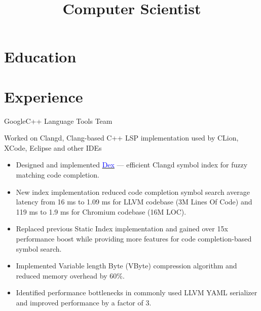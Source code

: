 \documentclass[10pt,a4paper,sans]{moderncv}
\title{Computer Scientist}
\begin{document}
\makecvtitle

\section{Education}

\section{Experience}
    {Google}{}{C++ Language Tools Team}
    {Worked on Clangd, Clang-based C++ LSP implementation used by CLion, XCode,
     Eclipse and other IDEs
     \begin{itemize}
       \item Designed and implemented
         \href{https://docs.google.com/document/d/1C-A6PGT6TynyaX4PXyExNMiGmJ2jL1UwV91Kyx11gOI/edit?usp=sharing}
         {\textcolor{blue}{Dex}} --- efficient Clangd symbol index for fuzzy
         matching code completion.
       \item New index implementation reduced code completion symbol search
         average latency from 16 ms to 1.09 ms for LLVM codebase (3M Lines Of
         Code) and 119 ms to 1.9 ms for Chromium codebase (16M LOC).
       \item Replaced previous Static Index implementation and gained over
         15x performance boost while providing more features for code
         completion-based symbol search.
       \item Implemented Variable length Byte (VByte) compression algorithm and
         reduced memory overhead by 60\%.
       \item Identified performance bottlenecks in commonly used LLVM YAML
         serializer and improved performance by a factor of 3.
     \end{itemize}}
\end{document}
